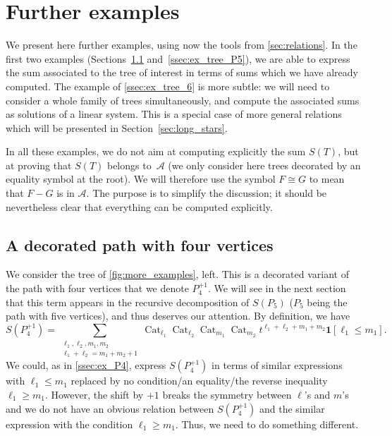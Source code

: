 \documentclass[12pt]{amsart}
\newcommand{\revision}[1]{{#1}}
\theoremstyle{plain}
\theoremstyle{remark}
\def\One{\bm{1}}
\DeclareMathOperator{\Cat}{Cat}
\def\cA{\mathcal{A}}
\begin{document}
\section{Further examples}
\label{sec:more_examples}
We present here further examples,
using now the tools from \cref{sec:relations}. 
\revision{In the first two examples (Sections~\ref{ssec:ex_P4+1} and~\ref{ssec:ex_tree_P5}), 
we are able to express the sum associated to the tree of interest in terms
of sums which we have already computed.
The example of \cref{ssec:ex_tree_6} is more subtle:
we will need to consider a whole family of trees simultaneously,
and compute the associated sums as solutions of a linear system.
This is a special case of more general relations which will be presented in Section~\ref{sec:long_stars}.}

In all these examples, we do not aim at
computing explicitly the sum $S(T)$, but at proving that  $S(T)$ belongs to~$\cA$
(we only consider here trees decorated by an equality symbol at the root).
We will therefore use the symbol $F \cong G$ to mean that $F-G$ is in $\cA$.
The purpose is to simplify the discussion; it should be nevertheless
clear that everything can be computed explicitly.

\subsection{A decorated path with four vertices}
\label{ssec:ex_P4+1}


We consider the tree of \cref{fig:more_examples}, left. 
This is a decorated variant of the path with four vertices that we denote $P_4^{+1}$.
We will see in the next section that this term appears in the recursive decomposition of $S(P_5)$
($P_5$ being the  path with five vertices), and thus deserves our attention.
By definition, we have
\[S(P_4^{+1})  = \sum_{\substack{\ell_1, \ell_2, m_1, m_2 \\ \ell_1 + \ell_2= m_1 + m_2 +1}}
 \Cat_{\ell_1} \Cat_{\ell_2}\Cat_{m_1}\Cat_{m_2}t^{\ell_1 + \ell_2+m_1 + m_2} \One[\ell_1 \le m_1].\]
  We could, as in \cref{ssec:ex_P4},
 express $S(P_4^{+1})$ in terms of similar expressions with $\ell_1 \le m_1$
 replaced by no condition/an equality/the reverse inequality $\ell_1 \ge m_1$.
 However, the shift by $+1$ breaks the symmetry between $\ell$'s and $m$'s
 and we do not have an obvious relation between $S(P_4^{+1}) $ 
 and the similar expression with the condition $\ell_1 \ge m_1$.
 Thus, we need to do something different.
 
\end{document}

